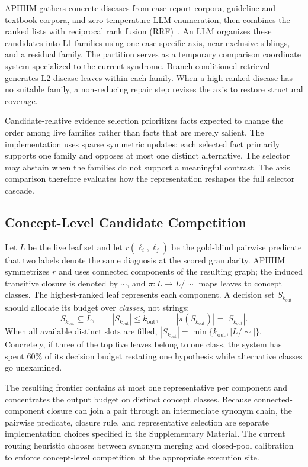 \documentclass[letterpaper]{article} %
\begin{document}
APHHM gathers concrete diseases from case-report corpora, guideline and textbook corpora, and zero-temperature LLM enumeration, then combines the ranked lists with reciprocal rank fusion (RRF)~\cite{rrf2009}.
An LLM organizes these candidates into L1 families using one case-specific axis, near-exclusive siblings, and a residual family.
The partition serves as a temporary comparison coordinate system specialized to the current syndrome.
Branch-conditioned retrieval generates L2 disease leaves within each family.
When a high-ranked disease has no suitable family, a non-reducing repair step revises the axis to restore structural coverage.

Candidate-relative evidence selection prioritizes facts expected to change the order among live families rather than facts that are merely salient.
The implementation uses sparse symmetric updates: each selected fact primarily supports one family and opposes at most one distinct alternative.
The selector may abstain when the families do not support a meaningful contrast.
The axis comparison therefore evaluates how the representation reshapes the full selector cascade.

\subsection{Concept-Level Candidate Competition}
\label{sec:m3}

Let $L$ be the live leaf set and let $r(\ell_i,\ell_j)$ be the gold-blind pairwise predicate that two labels denote the same diagnosis at the scored granularity.
APHHM symmetrizes $r$ and uses connected components of the resulting graph; the induced transitive closure is denoted by $\sim$, and $\pi:L\rightarrow L/\!\sim$ maps leaves to concept classes.
The highest-ranked leaf represents each component.
A decision set $S_{k_{\mathrm{out}}}$ should allocate its budget over \emph{classes}, not strings:
\[
S_{k_{\mathrm{out}}}\subseteq L,\qquad
|S_{k_{\mathrm{out}}}|\leq k_{\mathrm{out}},\qquad
|\pi(S_{k_{\mathrm{out}}})|=|S_{k_{\mathrm{out}}}|.
\]
When all available distinct slots are filled,
$|S_{k_{\mathrm{out}}}|=\min\{k_{\mathrm{out}},|L/\!\sim|\}$.
Concretely, if three of the top five leaves belong to one class, the system has spent $60\%$ of its decision budget restating one hypothesis while alternative classes go unexamined.

The resulting frontier contains at most one representative per component and concentrates the output budget on distinct concept classes.
Because connected-component closure can join a pair through an intermediate synonym chain, the pairwise predicate, closure rule, and representative selection are separate implementation choices specified in the Supplementary Material.
The current routing heuristic chooses between synonym merging and closed-pool calibration to enforce concept-level competition at the appropriate execution site.
\end{document}

